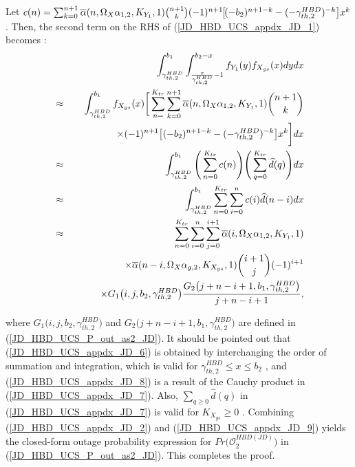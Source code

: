 Let $c(n) = \sum_{k=0}^{n+1} \overline{\alpha}(n,\Omega_X\alpha_{1,2},K_{Y_1},1) \binom{n+1}{k} (-1)^{n+1} \hspace{-0.05cm} \big[ \hspace{-0.05cm} (-b_2)^{n+1-k} \\ - (-\gamma_{th,2}^{HBD})^{-k} \big] x^k$. Then, the second term on the RHS of (\ref{JD_HBD_UCS_appdx_JD_1}) becomes \cite{andras2011generalized,bartoszewicz2012algebrability}:
\begin{eqnarray}
	& & \hspace{-2cm} \int_{\gamma_{th,2}^{HBD}}^{b_1} \int_{\frac{x}{\gamma_{th,2}^{HBD}}-1}^{b_2 - x} f_{Y_1}(y) f_{X_{gs}}(x) dydx \nonumber\\
	& \approx & \int_{\gamma_{th,2}^{HBD}}^{b_1} f_{X_{gs}}(x) \bigg[ \sum_{n=}^{K_{tr}} \sum_{k=0}^{n+1} \overline{\alpha}(n,\Omega_X\alpha_{1,2},K_{Y_1},1) \binom{n+1}{k} \nonumber \\ 
	& & \hspace{1cm} \times (-1)^{n+1} \big[ (-b_2)^{n+1-k} - (-\gamma_{th,2}^{HBD})^{-k} \big] x^k \bigg] dx \label{JD_HBD_UCS_appdx_JD_6} \\
	& \approx & \int_{\gamma_{th,2}^{HBD}}^{b_1} \Bigg( \sum_{n=0}^{K_{tr}} c(n) \Bigg) \Bigg( \sum_{q=0}^{K_{tr}} \widehat{d}(q)\Bigg) dx \label{JD_HBD_UCS_appdx_JD_7}\\ 
	& \approx & \int_{\gamma_{th,2}^{HBD}}^{b_1} \sum_{n=0}^{K_{tr}} \sum_{i=0}^{n} c(i) \widehat{d}(n-i) dx \label{JD_HBD_UCS_appdx_JD_8}\\
	& \approx & \sum_{n=0}^{K_{tr}} \sum_{i=0}^{n} \sum_{j=0}^{i+1} \overline{\alpha}(i,\Omega_X\alpha_{1,2},K_{Y_1},1) \nonumber\\
	& & \hspace{1cm} \times \overline{\alpha}(n-i,\Omega_X\alpha_{g,2},K_{X_{gs}},1) \binom{i+1}{j}(-1)^{i+1} \nonumber\\
	& & \hspace{1cm} \times G_1\big(i,j,b_2,\gamma_{th,2}^{HBD}\big) \frac{G_2\big(j+n-i+1,b_1,\gamma_{th,2}^{HBD}\big)}{j+n-i+1}, \label{JD_HBD_UCS_appdx_JD_9}
\end{eqnarray}

where $G_1\big(i,j,b_2,\gamma_{th,2}^{HBD}\big)$ and $G_2\big(j+n-i+1,b_1,\gamma_{th,2}^{HBD}\big)$ are defined in (\ref{JD_HBD_UCS_P_out_as2_JD}).
It should be pointed out that (\ref{JD_HBD_UCS_appdx_JD_6}) is obtained by interchanging the order of summation and integration, which is valid for $ \gamma_{th,2}^{HBD} \leq x \leq b_2 $ \cite{andras2011generalized}, and (\ref{JD_HBD_UCS_appdx_JD_8}) is a result of the Cauchy product \cite{amann2005analysis} in (\ref{JD_HBD_UCS_appdx_JD_7}). Also, $\sum_{q \geq 0} \widehat{d}(q)$ in (\ref{JD_HBD_UCS_appdx_JD_7}) is valid for $K_{X_{gs}}\geq0$ \cite{andras2011generalized}. Combining (\ref{JD_HBD_UCS_appdx_JD_2}) and (\ref{JD_HBD_UCS_appdx_JD_9}) yields the closed-form outage probability expression for $Pr\big(\mathcal{O}_{2}^{HBD(JD)}\big)$ in (\ref{JD_HBD_UCS_P_out_as2_JD}). This completes the proof.

